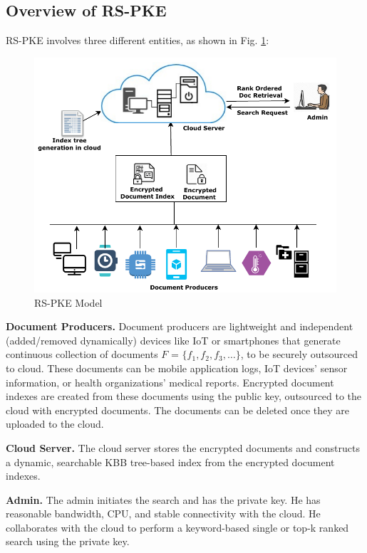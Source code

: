 \documentclass[sigconf,pdftex]{acmart}
\begin{document}
\subsection{Overview of RS-PKE}


RS-PKE involves three different entities, as shown in Fig. \ref{fig:SystemModel}:


\begin{figure}[htb]
\includegraphics[width=0.97\linewidth]{architechture-thesis}
\caption{RS-PKE Model}
\label{fig:SystemModel}
\end{figure}




\textbf{Document Producers.}
Document producers are lightweight and independent (added/removed dynamically) devices like IoT or smartphones that generate continuous collection of documents $F$ = $\{f_1, f_2, f_3,\dots\}$, to be securely outsourced to cloud. These documents can be mobile application logs, IoT devices' sensor information, or health organizations' medical reports. Encrypted document indexes are created from these documents using the public key, outsourced to the cloud with encrypted documents. The documents can be deleted once they are uploaded to the cloud. 

\textbf{Cloud Server.}
The cloud server stores the encrypted documents and constructs a dynamic, searchable KBB tree-based index from the encrypted document indexes.

\textbf{Admin.}
The admin initiates the search and has the private key. He has reasonable bandwidth, CPU, and stable connectivity with the cloud. He collaborates with the cloud to perform a keyword-based single or top-k ranked search using the private key.
\end{document}
